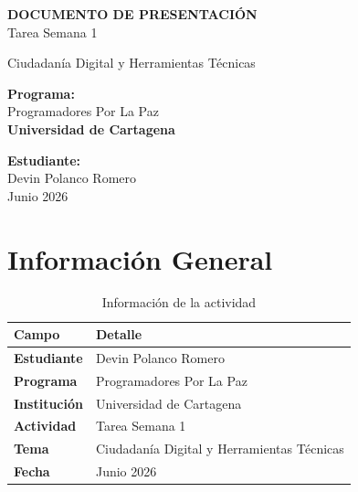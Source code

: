 \documentclass[12pt,a4paper]{article}
\begin{document}
\begin{titlepage}
    \centering
    \vspace*{2cm}
    
    {\Huge\bfseries\textcolor{azulgit}{DOCUMENTO DE PRESENTACIÓN}\\[0.5cm]}
    {\Large\textcolor{azulgit!70!black}{Tarea Semana 1}}\\[1cm]
    
    \vspace{1cm}
    
    {\Large Ciudadanía Digital y Herramientas Técnicas}\\[2cm]
    
    \vspace{2cm}
    
    {\large\textbf{Programa:}}\\
    {\large Programadores Por La Paz}\\[1.5cm]
    
    {\large\textbf{Universidad de Cartagena}}\\[2cm]
    
    \vfill
    
    {\large\textbf{Estudiante:}}\\
    {\Large Devin Polanco Romero}\\[1cm]
    
    {\large Junio 2026}
    
\end{titlepage}

\tableofcontents
\newpage

\section{Información General}

\begin{table}[h]
\centering
\begin{tabular}{|>{\bfseries}l|l|}
\hline
\textbf{Campo} & \textbf{Detalle} \\
\hline
Estudiante & Devin Polanco Romero \\
\hline
Programa & Programadores Por La Paz \\
\hline
Institución & Universidad de Cartagena \\
\hline
Actividad & Tarea Semana 1 \\
\hline
Tema & Ciudadanía Digital y Herramientas Técnicas \\
\hline
Fecha & Junio 2026 \\
\hline
\end{tabular}
\caption{Información de la actividad}
\end{table}
\end{document}
